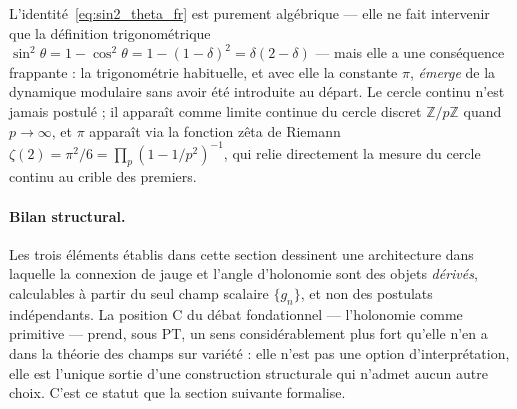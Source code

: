 L'identité~\eqref{eq:sin2_theta_fr} est purement algébrique --- elle
ne fait intervenir que la définition trigonométrique
$\sin^2 \theta = 1 - \cos^2 \theta = 1 - (1 - \delta)^2 = \delta
(2 - \delta)$ --- mais elle a une conséquence frappante : la
trigonométrie habituelle, et avec elle la constante $\pi$,
\emph{émerge} de la dynamique modulaire sans avoir été introduite
au départ. Le cercle continu n'est jamais postulé ; il apparaît
comme limite continue du cercle discret $\mathbb{Z}/p\mathbb{Z}$
quand $p \to \infty$, et $\pi$ apparaît via la fonction zêta de
Riemann $\zeta(2) = \pi^2/6 = \prod_p (1 - 1/p^2)^{-1}$, qui
relie directement la mesure du cercle continu au crible des
premiers.

\paragraph{Bilan structural.}
Les trois éléments établis dans cette section dessinent une
architecture dans laquelle la connexion de jauge et l'angle
d'holonomie sont des objets \emph{dérivés}, calculables à partir
du seul champ scalaire $\{g_n\}$, et non des postulats
indépendants. La position C du débat fondationnel ---
l'holonomie comme primitive --- prend, sous PT, un sens
considérablement plus fort qu'elle n'en a dans la théorie des
champs sur variété : elle n'est pas une option d'interprétation,
elle est l'unique sortie d'une construction structurale qui
n'admet aucun autre choix. C'est ce statut que la section
suivante formalise.
